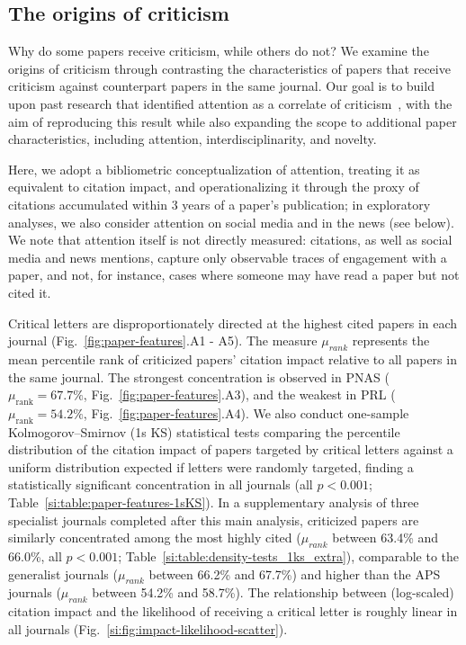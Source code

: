 \documentclass[12pt,a4paper]{article}
\numberwithin{equation}{section}
\begin{document}
\subsection*{The origins of criticism}
Why do some papers receive criticism, while others do not?
We examine the origins of criticism through contrasting the characteristics of papers that receive criticism against counterpart papers in the same journal.
Our goal is to build upon past research that identified attention as a correlate of criticism~\cite{radicchi_2012_comment}, with the aim of reproducing this result while also expanding the scope to additional paper characteristics, including attention, interdisciplinarity, and novelty.

Here, we adopt a bibliometric conceptualization of attention, treating it as equivalent to citation impact, and operationalizing it through the proxy of citations accumulated within 3 years of a paper's publication; in exploratory analyses, we also consider attention on social media and in the news (see below).
We note that attention itself is not directly measured: citations, as well as social media and news mentions, capture only observable traces of engagement with a paper, and not, for instance, cases where someone may have read a paper but not cited it.

Critical letters are disproportionately directed at the highest cited papers in each journal (Fig.~\ref*{fig:paper-features}.A1 - A5).
The measure $\mu_{rank}$ represents the mean percentile rank of criticized papers' citation impact relative to all papers in the same journal. 
The strongest concentration is observed in PNAS ($\mu_{\text{rank}} = 67.7\%$, Fig.~\ref*{fig:paper-features}.A3), and the weakest in PRL ($\mu_{\text{rank}} = 54.2\%$, Fig.~\ref*{fig:paper-features}.A4).
We also conduct one-sample Kolmogorov–Smirnov (1s KS) statistical tests comparing the percentile distribution of the citation impact of papers targeted by critical letters against a uniform distribution expected if letters were randomly targeted, finding a statistically significant concentration in all journals (all $p < 0.001$; Table~\ref*{si:table:paper-features-1sKS}).
In a supplementary analysis of three specialist journals completed after this main analysis, criticized papers are similarly concentrated among the most highly cited ($\mu_{rank}$ between 63.4\% and 66.0\%, all $p < 0.001$; Table~\ref*{si:table:density-tests_1ks_extra}), comparable to the generalist journals ($\mu_{rank}$ between 66.2\% and 67.7\%) and higher than the APS journals ($\mu_{rank}$ between 54.2\% and 58.7\%).
The relationship between (log-scaled) citation impact and the likelihood of receiving a critical letter is roughly linear in all journals (Fig.~\ref*{si:fig:impact-likelihood-scatter}).
\end{document}

